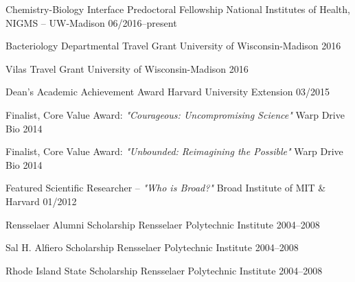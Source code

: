 



\begin{cvhonors}

  \cvhonor
    {Chemistry-Biology Interface Predoctoral Fellowship} %
    {National Institutes of Health, NIGMS -- UW-Madison} %
    {06/2016--present} %

  \cvhonor
    {Bacteriology Departmental Travel Grant} %
    {University of Wisconsin-Madison} %
    {2016} %

  \cvhonor
    {Vilas Travel Grant} %
    {University of Wisconsin-Madison} %
    {2016} %

  \cvhonor
    {Dean's Academic Achievement Award} %
    {Harvard University Extension} %
    {03/2015} %

  \cvhonor
    {Finalist, Core Value Award: \textit{"Courageous: Uncompromising Science"}} %
    {Warp Drive Bio} %
    {2014} %
    
  \cvhonor
    {Finalist, Core Value Award: \textit{"Unbounded: Reimagining the Possible"}} %
    {Warp Drive Bio} %
    {2014} %
    
  \cvhonor
    {Featured Scientific Researcher -- \textit{"Who is Broad?"}} %
    {Broad Institute of MIT \& Harvard} %
    {01/2012} %
    
  \cvhonor
    {Rensselaer Alumni Scholarship} %
    {Rensselaer Polytechnic Institute} %
    {2004--2008} %

  \cvhonor
    {Sal H. Alfiero Scholarship} %
    {Rensselaer Polytechnic Institute} %
    {2004--2008} %

  \cvhonor
    {Rhode Island State Scholarship} %
    {Rensselaer Polytechnic Institute} %
    {2004--2008} %

\end{cvhonors}